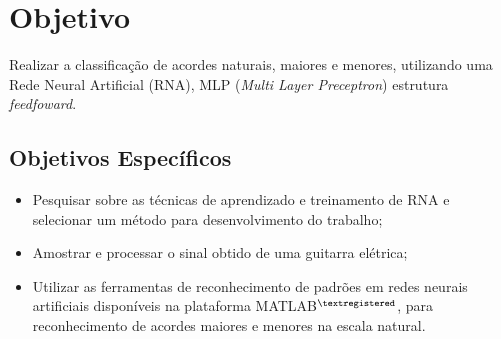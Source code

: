 \section{Objetivo}
Realizar a classificação de acordes naturais, maiores  e  menores, utilizando uma Rede Neural Artificial (RNA), MLP (\textit{Multi Layer Preceptron}) estrutura \textit{feedfoward}.

\subsection{Objetivos Específicos}

\begin{itemize}
   \item Pesquisar sobre as técnicas de aprendizado e treinamento de RNA e selecionar um método para desenvolvimento do trabalho;
   \item Amostrar e processar o sinal obtido de uma guitarra elétrica;
   \item Utilizar as ferramentas de reconhecimento de padrões em redes neurais artificiais disponíveis na plataforma MATLAB$^{\textregistered}$, para reconhecimento de acordes maiores e menores na escala natural.
\end{itemize} 
